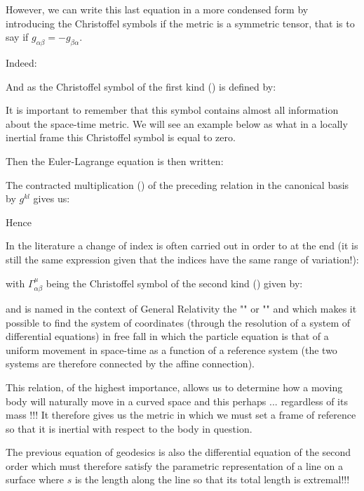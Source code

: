	However, we can write this last equation in a more condensed form by introducing the Christoffel symbols if the metric is a symmetric tensor, that is to say if $g_{\alpha\beta}=-g_{\beta\alpha}$.
	
	Indeed:
	
	And as the Christoffel symbol of the first kind ()
 is defined by:
	
	\begin{tcolorbox}[title=Remark,colframe=black,arc=10pt]
	It is important to remember that this symbol contains almost all information about the space-time metric. We will see an example below as what in a locally inertial frame this Christoffel symbol is equal to zero.
	\end{tcolorbox}
	Then the Euler-Lagrange equation is then written:
	
	The contracted multiplication () of the preceding relation in the canonical basis by $g^{kl}$ gives us:
	
	Hence
	
	In the literature a change of index is often carried out in order to at the end (it is still the same expression given that the indices have the same range of variation!):
	
	with $\Gamma_{\alpha\beta}^\mu$ being the Christoffel symbol of the second kind () given by:
	
	and is named in the context of General Relativity the "" or "" and which makes it possible to find the system of coordinates (through the resolution of a system of differential equations) in free fall in which the particle equation is that of a uniform movement in space-time as a function of a reference system (the two systems are therefore connected by the affine connection).

	This relation, of the highest importance, allows us to determine how a moving body will naturally move in a curved space and this perhaps ... regardless of its mass !!! It therefore gives us the metric in which we must set a frame of reference so that it is inertial with respect to the body in question.

	The previous equation of geodesics is also the differential equation of the second order which must therefore satisfy the parametric representation of a line on a surface where $s$ is the length along the line so that its total length is extremal!!!

